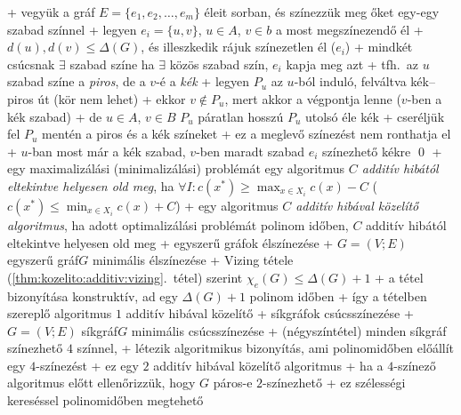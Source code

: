   + vegyük a gráf $E = \{ e_1, e_2, \ldots, e_m \}$ éleit sorban, és
    színezzük meg őket egy-egy szabad színnel
    + legyen $e_i = \{u, v\}$, $ u \in A$, $v \in b$ a most
      megszínezendő él
    + $d(u), d(v) \le \Delta(G)$, és illeszkedik rájuk színezetlen él
      ($e_i$)
      + \RA mindkét csúcsnak $\exists$ szabad színe \RA ha $\exists$
      közös szabad szín, $e_i$ kapja meg azt
  + tfh.~az $u$ szabad színe a \emph{piros}, de a $v$-é a \emph{kék}
    + legyen $P_u$ az $u$-ból induló, felváltva kék--piros út (kör nem
      lehet)
    + ekkor $v \notin P_u$, mert akkor a végpontja lenne ($v$-ben a
      kék szabad)
      + de $u \in A$, $v \in B$ \RA $P_u$ páratlan hosszú \RA $P_u$
        utolsó éle kék
    + cseréljük fel $P_u$ mentén a piros és a kék színeket
      + ez a meglevő színezést nem ronthatja el
      + $u$-ban most már a kék szabad, $v$-ben maradt szabad \RA%
        $e_i$ színezhető kékre \qed
+ \dfn egy maximalizálási (minimalizálási) problémát egy algoritmus
  \emph{$C$ additív hibától eltekintve helyesen old meg}, ha $\forall I:
  c(x^*) \ge \max_{x \in X_i} c(x) - C$ ($c(x^*) \le \min_{x \in X_i}
  c(x) + C$)
+ \dfn egy algoritmus \emph{$C$ additív hibával közelítő algoritmus},
  ha adott optimalizálási problémát polinom időben, $C$ additív
  hibától eltekintve helyesen old meg
+ \prob egyszerű gráfok élszínezése
  + \DataIn $G = (V; E)$ egyszerű gráf\qquad\DataOut $G$
    minimális élszínezése
  + Vizing tétele (\ref{thm:kozelito:additiv:vizing}.~tétel) szerint
    $\chi_e(G) \le \Delta(G) + 1$
    + a tétel bizonyítása konstruktív, ad egy $\Delta(G) + 1$ polinom
      időben
    + így a tételben szereplő algoritmus $1$ additív hibával közelítő
+ \prob síkgráfok csúcsszínezése
  + \DataIn $G = (V; E)$ síkgráf\qquad\DataOut $G$
    minimális csúcsszínezése
  + \thm (négyszíntétel) minden síkgráf színezhető $4$ színnel,
    \noproof
    + létezik algoritmikus bizonyítás, ami polinomidőben előállít egy
      $4$-színezést
    + ez egy $2$ additív hibával közelítő algoritmus
  + ha a $4$-színező algoritmus előtt ellenőrizzük, hogy $G$ páros-e
    \RA $2$-színezhető
    + ez szélességi kereséssel polinomidőben megtehető


